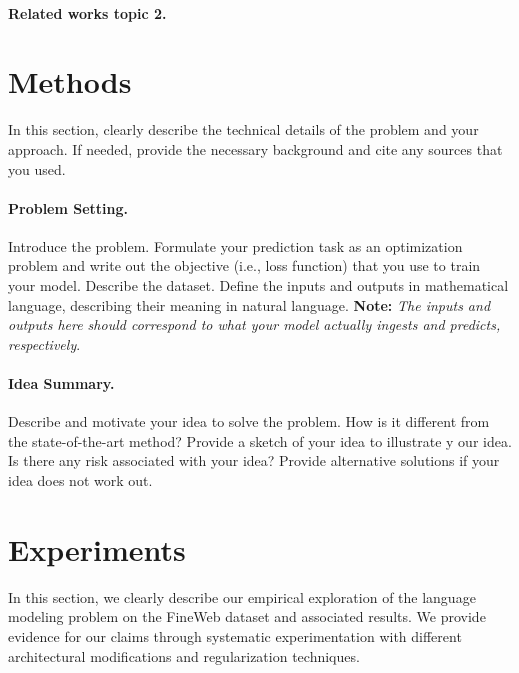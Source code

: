\documentclass{article}
\begin{document}
\paragraph{Related works topic 2.}
%

\section{Methods}
\label{sec:methods}
In this section, clearly describe the technical details of the problem and your approach. If needed, provide the necessary background and cite any sources that you used.


\paragraph{Problem Setting.}
Introduce the problem. Formulate your prediction task as an optimization problem and write out the objective (i.e., loss function) that you use to train your model. Describe the dataset. Define the inputs and outputs in mathematical language, describing their meaning in natural language. \textbf{Note:} \textit{The inputs and outputs here should correspond to what your model actually ingests and predicts, respectively}.


\paragraph{Idea Summary.}
Describe and motivate your idea to solve the problem.  How is it different from the state-of-the-art method? Provide a sketch of your idea to illustrate y our idea. Is there any risk associated with your idea? Provide alternative solutions if your idea does not work out.





\section{Experiments}
\label{sec:experiments}
%
In this section, we clearly describe our empirical exploration of the language modeling problem on the FineWeb dataset and associated results. We provide evidence for our claims through systematic experimentation with different architectural modifications and regularization techniques.
\end{document}
